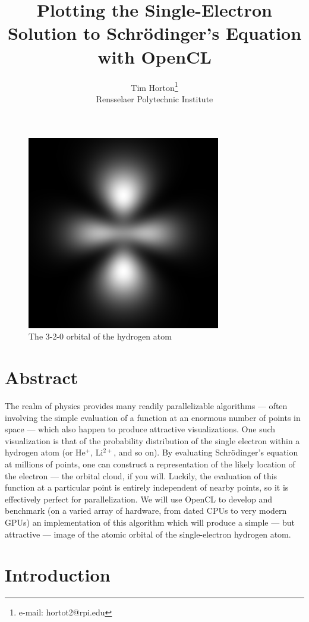 \documentclass{acmsiggraph}
\title{\Large Plotting the Single-Electron Solution to Schr\"{o}dinger's Equation with OpenCL}
\author{Tim Horton\thanks{e-mail: hortot2@rpi.edu}\\Rensselaer Polytechnic Institute}
\begin{document}
\maketitle

\begin{figure}
    \includegraphics[width=84.5mm]{320.png}
    \caption{The 3-2-0 orbital of the hydrogen atom}
\end{figure}

\section{Abstract}

The realm of physics provides many readily parallelizable algorithms --- often involving the simple evaluation of a function at an enormous number of points in space --- which also happen to produce attractive visualizations. One such visualization is that of the probability distribution of the single electron within a hydrogen atom (or He$^+$, Li$^{2+}$, and so on). By evaluating Schr\"{o}dinger's equation at millions of points, one can construct a representation of the likely location of the electron --- the orbital cloud, if you will. Luckily, the evaluation of this function at a particular point is entirely independent of nearby points, so it is effectively perfect for parallelization. We will use OpenCL to develop and benchmark (on a varied array of hardware, from dated CPUs to very modern GPUs) an implementation of this algorithm which will produce a simple --- but attractive --- image of the atomic orbital of the single-electron hydrogen atom.

\section{Introduction}
\end{document}
